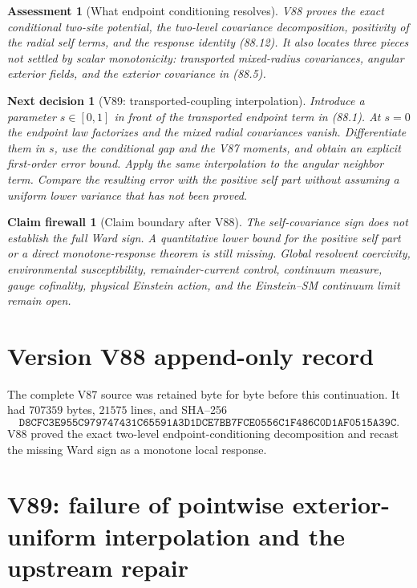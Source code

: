 \documentclass[11pt]{article}
\newtheorem{firewall}[theorem]{Claim firewall}
\newtheorem{decision}[theorem]{Next decision}
\newtheorem{assessment}[theorem]{Assessment}
\theoremstyle{remark}
\begin{document}
\begin{assessment}[What endpoint conditioning resolves]
\label{ass:v17v88-status}
V88 proves the exact conditional two-site potential, the two-level
covariance decomposition, positivity of the radial self terms, and the
response identity (88.12).  It also locates three pieces not settled by
scalar monotonicity: transported mixed-radius covariances, angular
exterior fields, and the exterior covariance in (88.5).
\end{assessment}

\begin{decision}[V89: transported-coupling interpolation]
\label{dec:v17v88-next}
Introduce a parameter \(s\in[0,1]\) in front of the transported
endpoint term in (88.1).  At \(s=0\) the endpoint law factorizes and
the mixed radial covariances vanish.  Differentiate them in \(s\), use
the conditional gap and the V87 moments, and obtain an explicit
first-order error bound.  Apply the same interpolation to the angular
neighbor term.  Compare the resulting error with the positive self
part without assuming a uniform lower variance that has not been
proved.
\end{decision}

\begin{firewall}[Claim boundary after V88]
\label{fire:v17v88}
The self-covariance sign does not establish the full Ward sign.  A
quantitative lower bound for the positive self part or a direct
monotone-response theorem is still missing.  Global resolvent
coercivity, environmental susceptibility, remainder-current control,
continuum measure, gauge cofinality, physical Einstein action, and the
Einstein--SM continuum limit remain open.
\end{firewall}

\section*{Version V88 append-only record}
The complete V87 source was retained byte for byte before this
continuation.  It had \(707359\) bytes, \(21575\) lines, and SHA--256
\[
 \texttt{D8CFC3E955C979747431C65591A3D1DCE7BB7FCE0556C1F486C0D1AF0515A39C}.
\]
V88 proved the exact two-level endpoint-conditioning decomposition and
recast the missing Ward sign as a monotone local response.


\section{V89: failure of pointwise exterior-uniform interpolation and the upstream repair}
\label{sec:v17v89}
\end{document}
